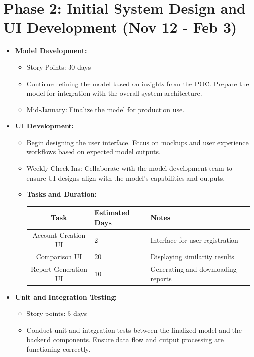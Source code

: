 \documentclass[12pt]{article}
\begin{document}
\section*{Phase 2: Initial System Design and UI Development (Nov 12 - Feb 3)}
\begin{itemize}
    \item \textbf{Model Development:}
    \begin{itemize}
        \item Story Points: 30 days
        \item Continue refining the model based on insights from the POC. Prepare the model for integration with the overall system architecture.
        \item Mid-January: Finalize the model for production use.
    \end{itemize}

    \item \textbf{UI Development:}
    \begin{itemize}
        \item Begin designing the user interface. Focus on mockups and user experience workflows based on expected model outputs.
        \item Weekly Check-Ins: Collaborate with the model development team to ensure UI designs align with the model's capabilities and outputs.
        \item \textbf{Tasks and Duration:}

        \begin{tabular}{|c|p{4cm}|p{4cm}|p{4cm}|}
            \hline
            \textbf{Task} & \textbf{Estimated Days} & \textbf{Notes} \\
            \hline
            Account Creation UI & 2 & Interface for user registration \\
            \hline
            Comparison UI & 20 & Displaying similarity results \\
            \hline
            Report Generation UI & 10 & Generating and downloading reports \\
            \hline
        \end{tabular}
    \end{itemize}

    \item \textbf{Unit and Integration Testing:}
    \begin{itemize}
        \item Story points: 5 days
        \item Conduct unit and integration tests between the finalized model and the backend components. Ensure data flow and output processing are functioning correctly.
    \end{itemize}
\end{itemize}
\end{document}
